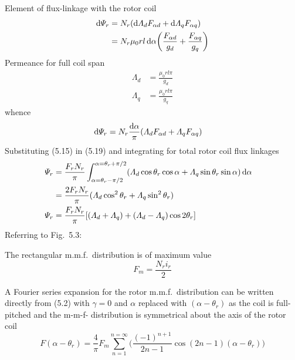 \documentclass[a4paper,numbers=noenddot,12pt]{scrbook}
\begin{document}
        Element of flux-linkage with the rotor coil
        \begin{equation}
            \begin{aligned}
                \dif \varPsi_r & = N_r (\dif \varLambda_d F_{\alpha d} + \dif \varLambda_q F_{\alpha q}) \\
                & = N_r \mu_0 r l \dif \alpha \bigg(\frac{F_{\alpha d}}{g_d} + \frac{F_{\alpha q}}{g_q} \bigg) 
            \end{aligned}
        \end{equation}
        Permeance for full coil span
        \begin{equation}
            \begin{aligned}
                \varLambda_d & = \frac{\mu_0 r l \pi}{g_d}  \\
                \varLambda_q & = \frac{\mu_0 r l \pi}{g_q} 
            \end{aligned}
        \end{equation}
        whence
        \begin{align}
            \dif \varPsi_r & = N_r \frac{\dif \alpha}{\pi} (\varLambda_d F_{\alpha d} + \varLambda_q F_{\alpha q})
        \end{align} 
        Substituting (5.15) in (5.19) and integrating for total rotor coil flux linkages
        \begin{align}
            \varPsi_r & = \frac{F_r N_r}{\pi} \int_{\alpha = \theta_r  - \pi/2}^{\alpha = \theta_r  + \pi/2} (\varLambda_d \cos \theta_r \cos\alpha + \varLambda_q \sin \theta_r \sin \alpha) \dif \alpha && \\
            & = \frac{2 F_r N_r}{\pi} (\varLambda_d \cos^2 \theta_r + \varLambda_q \sin^2 \theta_r) && \nonumber \\
            \varPsi_r & = \frac{F_r N_r}{\pi} [(\varLambda_d + \varLambda_q) + (\varLambda_d - \varLambda_q)\cos 2 \theta_r ] &&
        \end{align}
        Referring to Fig.\ 5.3:

        \noindent
        The rectangular m.m.f.\ distribution is of maximum value
        \begin{equation*}
            F_m=\frac{N_r i_r}{2}
        \end{equation*}

        A Fourier series expansion for the rotor m.m.f.\ distribution can be written directly from (5.2) with $\gamma=0$ and $\alpha$ replaced with $(\alpha - \theta_r)$ as the coil is full-pitched and the m-m-f- distribution is symmetrical about the axis of the rotor coil
        \begin{equation*}
            F(\alpha - \theta_r) = \frac{4}{\pi} F_m \displaystyle \sum_{n = 1}^{n = \infty} \bigg( \frac{{(-1)}^{n+1}}{2n - 1} \cos(2n - 1)(\alpha - \theta_r) \bigg)
        \end{equation*}
\end{document}
